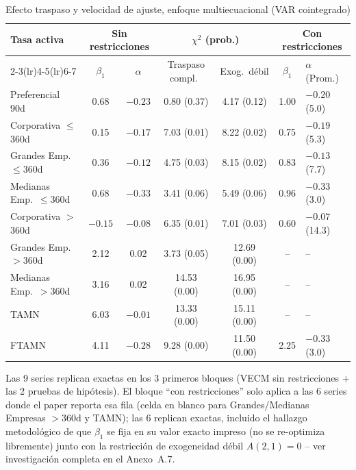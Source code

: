 \documentclass[12pt, letterpaper]{article}
\begin{document}
\begin{table}[ht]
\renewcommand{\thetable}{5}
\begin{threeparttable}
\caption{Efecto traspaso y velocidad de ajuste, enfoque
         multiecuacional (VAR cointegrado)}
\label{tab:cuadro5}
\small
\begin{tabular}{lcccccl}
\toprule
Tasa activa & \multicolumn{2}{c}{Sin restricciones} & \multicolumn{2}{c}{$\chi^2$ (prob.)} & \multicolumn{2}{c}{Con restricciones}\\
\cmidrule(lr){2-3}\cmidrule(lr){4-5}\cmidrule(lr){6-7}
 & $\beta_1$ & $\alpha$ & Traspaso compl.\ & Exog.\ débil & $\beta_1$ & $\alpha$ (Prom.)\\
\midrule
Preferencial 90d          & 0.68  & $-0.23$ & 0.80 (0.37)  & 4.17 (0.12)  & 1.00 & $-0.20$ (5.0)\\
Corporativa $\le$360d     & 0.15  & $-0.17$ & 7.03 (0.01)  & 8.22 (0.02)  & 0.75 & $-0.19$ (5.3)\\
Grandes Emp.\ $\le$360d   & 0.36  & $-0.12$ & 4.75 (0.03)  & 8.15 (0.02)  & 0.83 & $-0.13$ (7.7)\\
Medianas Emp.\ $\le$360d  & 0.68  & $-0.33$ & 3.41 (0.06)  & 5.49 (0.06)  & 0.96 & $-0.33$ (3.0)\\
Corporativa $>$360d       & $-0.15$&$-0.08$ & 6.35 (0.01)  & 7.01 (0.03)  & 0.60 & $-0.07$ (14.3)\\
Grandes Emp.\ $>$360d     & 2.12  & 0.02    & 3.73 (0.05)  & 12.69 (0.00) & --   & -- \\
Medianas Emp.\ $>$360d    & 3.16  & 0.02    & 14.53 (0.00) & 16.95 (0.00) & --   & -- \\
TAMN                      & 6.03  & $-0.01$ & 13.33 (0.00) & 15.11 (0.00) & --   & -- \\
FTAMN                     & 4.11  & $-0.28$ & 9.28 (0.00)  & 11.50 (0.00) & 2.25 & $-0.33$ (3.0)\\
\bottomrule
\end{tabular}
\begin{tablenotes}[flushleft]
\footnotesize\item
Las 9 series replican exactas en los 3 primeros bloques (VECM sin
restricciones + las 2 pruebas de hipótesis). El bloque ``con
restricciones'' solo aplica a las 6 series donde el paper reporta
esa fila (celda en blanco para Grandes/Medianas Empresas $>$360d y
TAMN); las 6 replican exactas, incluido el hallazgo metodológico de
que $\beta_1$ se fija en su valor exacto impreso (no se re-optimiza
libremente) junto con la restricción de exogeneidad débil
$A(2,1)=0$ -- ver investigación completa en el Anexo~A.7.
\end{tablenotes}
\end{threeparttable}
\end{table}
\end{document}
